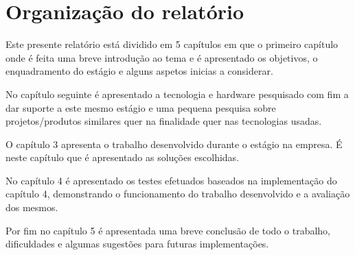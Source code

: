 \section{Organização do relatório}

\par Este presente relatório está dividido em 5 capítulos em que o primeiro capítulo onde é feita uma breve introdução ao tema e é apresentado os objetivos, o enquadramento do estágio e alguns aspetos inicias a considerar. 
\par No capítulo seguinte é apresentado a tecnologia e hardware pesquisado com fim a dar suporte a este mesmo estágio e uma pequena pesquisa sobre projetos/produtos similares quer na finalidade quer nas tecnologias usadas. 
\par O capítulo 3 apresenta o trabalho desenvolvido durante o estágio na empresa. É neste capítulo que é apresentado as soluções escolhidas. 
\par No capítulo 4 é  apresentado os testes efetuados baseados na implementação do capítulo 4, demonstrando o funcionamento do trabalho desenvolvido e a avaliação dos mesmos. 
\par Por fim no capítulo 5 é apresentada uma breve conclusão de todo o trabalho, dificuldades e algumas sugestões para futuras implementações. 

